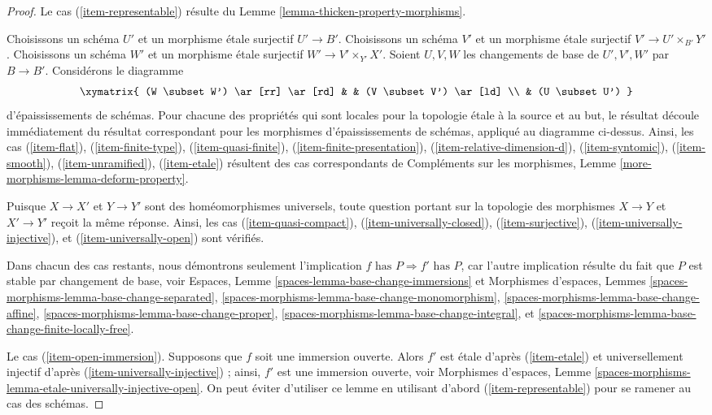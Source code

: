 \begin{proof}
Le cas (\ref{item-representable}) résulte du
Lemme \ref{lemma-thicken-property-morphisms}.

\medskip\noindent
Choisissons un schéma $U'$ et un morphisme étale surjectif $U' \to B'$.
Choisissons un schéma $V'$ et un morphisme étale surjectif
$V' \to U' \times_{B'} Y'$.
Choisissons un schéma $W'$ et un morphisme étale surjectif
$W' \to V' \times_{Y'} X'$. Soient $U, V, W$ les changements de base
de $U', V', W'$ par $B \to B'$. Considérons le diagramme
$$
\xymatrix{
(W \subset W') \ar[rr] \ar[rd] & & (V \subset V') \ar[ld] \\
& (U \subset U')
}
$$
d'épaississements de schémas. Pour chacune des propriétés qui sont
locales pour la topologie étale à la source et au but, le résultat découle immédiatement
du résultat correspondant pour les morphismes d'épaississements de schémas,
appliqué au diagramme ci-dessus. Ainsi, les cas
(\ref{item-flat}), (\ref{item-finite-type}),
(\ref{item-quasi-finite}), (\ref{item-finite-presentation}),
(\ref{item-relative-dimension-d}), (\ref{item-syntomic}),
(\ref{item-smooth}), (\ref{item-unramified}), (\ref{item-etale})
résultent des cas correspondants de
Compléments sur les morphismes, Lemme \ref{more-morphisms-lemma-deform-property}.

\medskip\noindent
Puisque $X \to X'$ et $Y \to Y'$ sont des homéomorphismes universels,
toute question portant sur la topologie des morphismes
$X \to Y$ et $X' \to Y'$ reçoit la même réponse. Ainsi,
les cas (\ref{item-quasi-compact}), (\ref{item-universally-closed}),
(\ref{item-surjective}), (\ref{item-universally-injective}), et
(\ref{item-universally-open}) sont vérifiés.

\medskip\noindent
Dans chacun des cas restants, nous démontrons seulement l'implication
$f\text{ has }P \Rightarrow f'\text{ has }P$, car l'autre
implication résulte du fait que $P$ est stable par
changement de base, voir
Espaces, Lemme \ref{spaces-lemma-base-change-immersions} et
Morphismes d'espaces, Lemmes
\ref{spaces-morphisms-lemma-base-change-separated},
\ref{spaces-morphisms-lemma-base-change-monomorphism},
\ref{spaces-morphisms-lemma-base-change-affine},
\ref{spaces-morphisms-lemma-base-change-proper},
\ref{spaces-morphisms-lemma-base-change-integral}, et
\ref{spaces-morphisms-lemma-base-change-finite-locally-free}.

\medskip\noindent
Le cas (\ref{item-open-immersion}). Supposons que $f$ soit une immersion ouverte.
Alors $f'$ est étale d'après (\ref{item-etale}) et universellement injectif
d'après (\ref{item-universally-injective}) ;
ainsi, $f'$ est une immersion ouverte, voir
Morphismes d'espaces, Lemme
\ref{spaces-morphisms-lemma-etale-universally-injective-open}.
On peut éviter d'utiliser ce lemme en
utilisant d'abord (\ref{item-representable}) pour se ramener au cas des schémas.


\end{proof}
